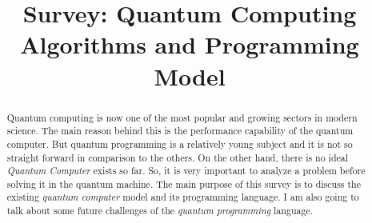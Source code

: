 \documentclass[11pt, conference, onecolumn]{IEEEtran}
\begin{document}
\title{Survey: Quantum Computing Algorithms and Programming Model}

\author{
}


\maketitle

%

\begin{abstract}
 Quantum computing is now one of the most popular and growing sectors in modern science. The main reason behind this 
is the performance capability of the quantum computer. But quantum programming is a relatively young subject and it is not 
so straight forward in comparison to the others. On the other hand, there is no ideal \textit{Quantum Computer} exists so far. So, 
it is very important to analyze a problem before solving it in the quantum machine. The main purpose of this survey is to discuss 
the existing \textit{quantum computer} model and its programming language. I am also going to talk about some future challenges of the 
\textit{quantum programming} language.  
\end{abstract}
\end{document}
